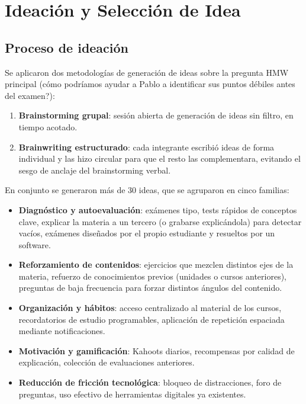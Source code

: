 \documentclass[11pt,a4paper]{article}
\begin{document}
\section{Ideaci\'on y Selecci\'on de Idea}

\subsection{Proceso de ideaci\'on}

Se aplicaron dos metodolog\'ias de generaci\'on de ideas sobre la pregunta HMW principal (\textquestiondown c\'omo podr\'iamos ayudar a Pablo a identificar sus puntos d\'ebiles antes del examen?):

\begin{enumerate}
\item \textbf{Brainstorming grupal}: sesi\'on abierta de generaci\'on de ideas sin filtro, en tiempo acotado.
\item \textbf{Brainwriting estructurado}: cada integrante escribi\'o ideas de forma individual y las hizo circular para que el resto las complementara, evitando el sesgo de anclaje del brainstorming verbal.
\end{enumerate}

En conjunto se generaron m\'as de 30 ideas, que se agruparon en cinco familias:

\begin{itemize}[itemsep=1pt]
\item \textbf{Diagn\'ostico y autoevaluaci\'on}: ex\'amenes tipo, tests r\'apidos de conceptos clave, explicar la materia a un tercero (o grabarse explic\'andola) para detectar vac\'ios, ex\'amenes dise\~nados por el propio estudiante y resueltos por un software.
\item \textbf{Reforzamiento de contenidos}: ejercicios que mezclen distintos ejes de la materia, refuerzo de conocimientos previos (unidades o cursos anteriores), preguntas de baja frecuencia para forzar distintos \'angulos del contenido.
\item \textbf{Organizaci\'on y h\'abitos}: acceso centralizado al material de los cursos, recordatorios de estudio programables, aplicaci\'on de repetici\'on espaciada mediante notificaciones.
\item \textbf{Motivaci\'on y gamificaci\'on}: Kahoots diarios, recompensas por calidad de explicaci\'on, colecci\'on de evaluaciones anteriores.
\item \textbf{Reducci\'on de fricci\'on tecnol\'ogica}: bloqueo de distracciones, foro de preguntas, uso efectivo de herramientas digitales ya existentes.
\end{itemize}
\end{document}
